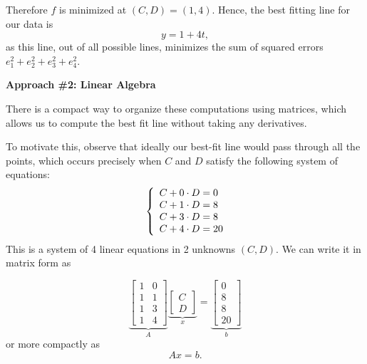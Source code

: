 \documentclass[10pt]{article}
\theoremstyle{definition}
\newcommand{\vt}{\vskip 5mm} %
\newcommand{\Fl}{\vt\noindent\textbf} %
\newcommand{\1}[1]{\textbf{1}_{\left[#1\right]}} %
\begin{document}
Therefore $f$ is minimized at $(C,D)=(1,4)$. Hence, the best fitting line for
our data is
\begin{equation*}
  y=1+4t,
\end{equation*}
as this line, out of all possible lines, minimizes the sum of squared errors
$e_{1}^{2}+e_{2}^{2}+e_{3}^{2}+e_{4}^{2}$.

\Fl{Approach \#2: Linear Algebra}

There is a compact way to organize these computations using matrices, which
allows us to compute the best fit line without taking any derivatives.

To motivate this, observe that ideally our best-fit line would pass through
all the points, which occurs precisely when $C$ and $D$ satisfy the following
system of equations:
\begin{equation*}
  \left\{ \begin{array}{l@{}l}
      C+0\cdot D=0 \\
      C+1\cdot D=8 \\
      C+3\cdot D=8 \\
      C+4\cdot D=20 \\
    \end{array}\right.
\end{equation*}
This is a system of 4 linear equations in 2 unknowns $(C,D)$. We can write it
in matrix form as

\begin{equation*}
  \underbrace{\begin{bmatrix}
      1&0\\
      1&1\\
      1&3\\
      1&4
    \end{bmatrix}}_{A}
  \underbrace{\begin{bmatrix}
      C\\D
    \end{bmatrix}}_{x}
  =
  \underbrace{\begin{bmatrix}
      0\\8\\8\\20
    \end{bmatrix}}_{b}
\end{equation*}
or more compactly as
\begin{equation*}
  Ax=b.
\end{equation*}
\end{document}

